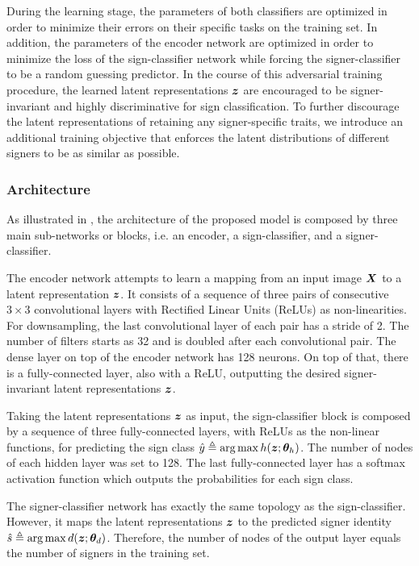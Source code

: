 During the learning stage, the parameters of both classifiers are optimized in order to minimize their errors on their specific tasks on the training set. In addition, the parameters of the encoder network are optimized in order to minimize the loss of the sign-classifier network while forcing the signer-classifier to be a random guessing predictor. In the course of this adversarial training procedure, the learned latent representations ${\bm{z}}$ are encouraged to be signer-invariant and highly discriminative for sign classification. To further discourage the latent representations of retaining any signer-specific traits, we introduce an additional training objective that enforces the latent distributions of different signers to be as similar as possible.

\subsubsection{Architecture}
As illustrated in , the architecture of the proposed model is composed by three main sub-networks or blocks, i.e. an encoder, a sign-classifier, and a signer-classifier.

The encoder network attempts to learn a mapping from an input image ${\bm{X}}$ to a latent representation ${\bm{z}}$. It consists of a sequence of three pairs of consecutive $3\times 3$ convolutional layers with Rectified  Linear  Units (ReLUs) as non-linearities. For downsampling, the last convolutional layer of each pair has a stride of 2. The number of filters starts as 32 and is doubled after each convolutional pair. The dense layer on top of the encoder network has 128 neurons. On top of that, there is a fully-connected layer, also with a ReLU, outputting the desired signer-invariant latent representations ${\bm{z}}$.

Taking the latent representations ${\bm{z}}$ as input, the sign-classifier block is composed by a sequence of three fully-connected layers, with ReLUs as the non-linear functions, for predicting the sign class $\hat{y} \triangleq \operatorname*{arg\,max} h({\bm{z}}; {\bm{\theta}}_h)$. The number of nodes of each hidden layer was set to 128. The last fully-connected layer has a softmax activation function which outputs the probabilities for each sign class.

The signer-classifier network has exactly the same topology as the sign-classifier. However, it maps the latent representations ${\bm{z}}$ to the predicted signer identity $\hat{s} \triangleq \operatorname*{arg\,max} d({\bm{z}}; {\bm{\theta}}_d)$. Therefore, the number of nodes of the output layer equals the number of signers in the training set.


